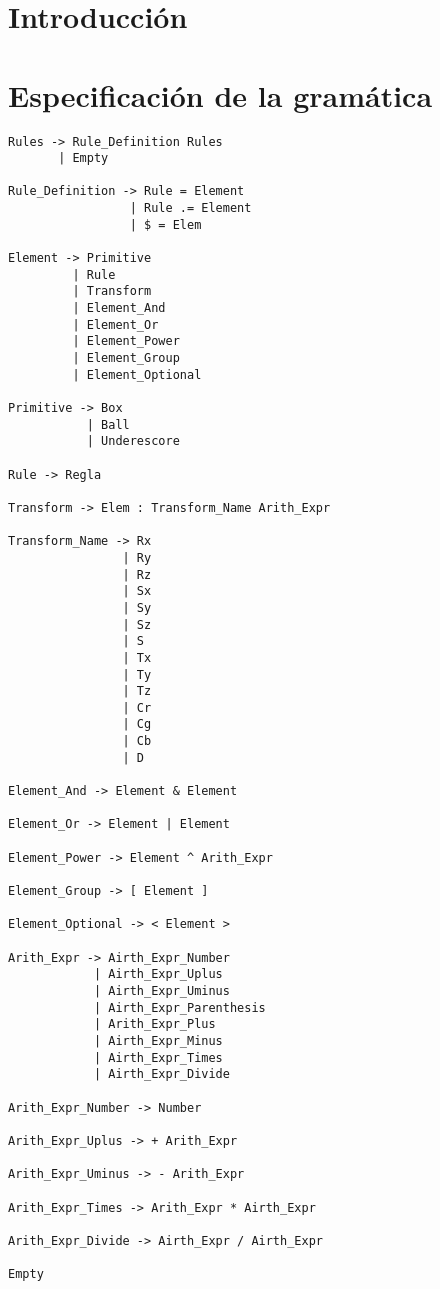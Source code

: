 \documentclass[a4paper, 10pt, twoside]{article}
\begin{document}
\section{Introducción}

\section{Especificación de la gramática}
\begin{verbatim}
Rules -> Rule_Definition Rules
       | Empty

Rule_Definition -> Rule = Element
                 | Rule .= Element
                 | $ = Elem

Element -> Primitive
         | Rule
         | Transform
         | Element_And
         | Element_Or
         | Element_Power
         | Element_Group
         | Element_Optional

Primitive -> Box
           | Ball
           | Underescore

Rule -> Regla

Transform -> Elem : Transform_Name Arith_Expr

Transform_Name -> Rx
                | Ry
                | Rz
                | Sx
                | Sy
                | Sz
                | S
                | Tx
                | Ty
                | Tz
                | Cr
                | Cg
                | Cb
                | D

Element_And -> Element & Element

Element_Or -> Element | Element

Element_Power -> Element ^ Arith_Expr

Element_Group -> [ Element ]

Element_Optional -> < Element >

Arith_Expr -> Airth_Expr_Number
            | Airth_Expr_Uplus
            | Airth_Expr_Uminus
            | Airth_Expr_Parenthesis
            | Arith_Expr_Plus
            | Airth_Expr_Minus
            | Airth_Expr_Times
            | Airth_Expr_Divide

Arith_Expr_Number -> Number

Arith_Expr_Uplus -> + Arith_Expr

Arith_Expr_Uminus -> - Arith_Expr

Arith_Expr_Times -> Arith_Expr * Airth_Expr

Arith_Expr_Divide -> Airth_Expr / Airth_Expr

Empty

\end{verbatim}
\end{document}
